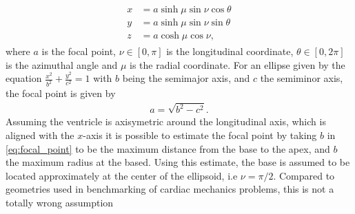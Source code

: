 \begin{align}
  \begin{split}
    x &= a \sinh \mu \sin \nu \cos \theta  \\
    y &= a \sinh \mu \sin \nu \sin \theta  \\
    z &= a \cosh \mu \cos \nu,
  \end{split}
\end{align}
where $a$ is the focal point, $\nu \in [0, \pi]$ is the longitudinal
coordinate, $\theta \in [0, 2\pi]$ is the azimuthal angle and $\mu$
is the radial coordinate. For an ellipse given by the equation
$\frac{x^2}{b^2} +\frac{y^2}{c^2}  = 1$ with $b$ being the semimajor
axis, and $c$ the semiminor axis, the focal point is given by
\begin{align}
  a =\sqrt{b^2 - c^2}.
  \label{eq:focal_point}
\end{align}
Assuming the ventricle is axisymetric around the
longitudinal axis, which is aligned with the $x$-axis it is possible
to estimate the focal point by taking $b$ in \eqref{eq:focal_point} to
be the maximum distance from the base to the apex, and $b$ the maximum
radius at the based. Using this estimate, the base is assumed to be
located approximately at the center of the ellipsoid, i.e $\nu = \pi /
2$. Compared to geometries used in benchmarking of cardiac mechanics
problems, this is not a totally wrong assumption
\cite{land2015verification}




